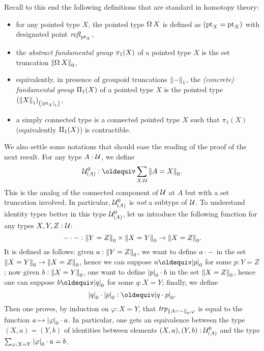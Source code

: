 Recall to this end the following definitions that are standard in
homotopy theory:
\begin{itemize}
\item for any pointed type $X$, the pointed type $\loopspace X$ is
  defined as $(\mathrm{pt}_X = \mathrm{pt}_X)$ with designated point $\mathop{\mathit{refl}_{\mathrm{pt}_X}}$,
\item the {\em abstract fundamental group} $\operatorname{\pi_1}(X)$ of a pointed type
  $X$ is the set truncation $\setTrunc{\loopspace X}$,
\item equivalently, in presence of groupoid truncations
  ${\lVert{-}\rVert}_1$, the {\em (concrete) fundamental group}
  $\operatorname{\Pi_1}(X)$ of a pointed type $X$ is the pointed type
  ${{\left({\lVert X\rVert}_1\right)}_{\left({\lvert\mathrm{pt}_X\rvert}_1\right)}}$,
\item a simply connected type is a connected pointed type $X$ such
  that $\pi_1(X)$ (equivalently $\operatorname{\Pi_1}(X)$) is contractible.
\end{itemize}
We also settle some notations that should ease the reading of the
proof of the next result. For any type $A:\mathcal{U}$, we define
\begin{displaymath}
  \univcover \UU A \defequi \sum_{X:\UU}\setTrunc{A=X}.
\end{displaymath}
This is the analog of the connected component of $\mathcal{U}$ at $A$ but with
a set truncation involved. In particular, ${{\mathcal{U}}^0_{\left(A\right)}}$ is {\em
  not} a subtype of $\mathcal{U}$. To understand identity types better in this
type ${{\mathcal{U}}^0_{\left(A\right)}}$, let us introduce the following function for
any types $X,Y,Z:\mathcal{U}$:
\begin{displaymath}
  {-}\cdot{-} : {\lVert Y=Z\rVert}_0 \times {\lVert X=Y\rVert}_0 \to {\lVert X=Z\rVert}_0.
\end{displaymath}
It is defined as follows: given $a: {\lVert Y=Z\rVert}_0$, we want to define
$a\cdot{-}$ in the set ${\lVert X=Y\rVert}_0 \to {\lVert X=Z\rVert}_0$, hence
we can suppose $a\jdeq\settrunc p$ for some $p:Y=Z$; now given
$b:{\lVert X=Y\rVert}_0$, one want to define ${\lvert p\rvert}_0 \cdot b$ in the
set ${\lVert X=Z\rVert}_0$, hence one can suppose $b\jdeq\settrunc q$ for some
$q:X=Y$; finally, we define
\begin{displaymath}
  \settrunc{q} \cdot \settrunc{p} \defequi \settrunc{q\cdot p}.
\end{displaymath}
Then one proves, by induction on $\varphi:X=Y$, that
$\trp[\setTrunc{A=\blank}]\varphi$ is equal to the function
$a\mapsto {\lvert\varphi\rvert}_0\cdot a$. In particular, one gets an
equivalence between the type $(X,a) = (Y,b)$ of identities between
elements $(X,a), (Y,b): {{\mathcal{U}}^0_{\left(A\right)}}$ and the type
$\sum_{\varphi:X=Y}{\lvert\varphi\rvert}_0 \cdot a = b$.

